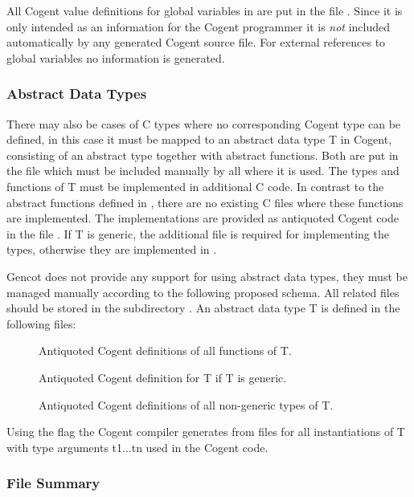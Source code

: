 All Cogent value definitions for global variables in  are put in the file . Since it
is only intended as an information for the Cogent programmer it is \textit{not} included automatically by any generated
Cogent source file. For external references to global variables no information is generated.

\subsubsection{Abstract Data Types}

There may also be cases of C types where no corresponding Cogent type can be defined, in this case it must be mapped to an 
abstract data type T in Cogent, consisting of an abstract type together with abstract functions. Both are put in 
the file  which must be included manually by all  where it is used. The types and 
functions of T must be implemented in additional C code. In contrast to the abstract functions defined in ,
there are no existing C files where these functions are implemented. The implementations are provided as antiquoted Cogent 
code in the file . If T is generic, the additional file  is required for 
implementing the types, otherwise they are implemented in . 

Gencot does not provide any support for using abstract data types, they must be managed manually according to the following
proposed schema. All related files should be stored in the subdirectory .
An abstract data type T is defined in the following files:
\begin{description}
\item[] Antiquoted Cogent definitions of all functions of T. 
\item[] Antiquoted Cogent definition for T if T is generic.
\item[] Antiquoted Cogent definitions of all non-generic types of T.
\end{description}
Using the flag  the Cogent compiler generates from  files  for all 
instantiations of T with type arguments t1...tn used in the Cogent code.

\subsubsection{File Summary}

